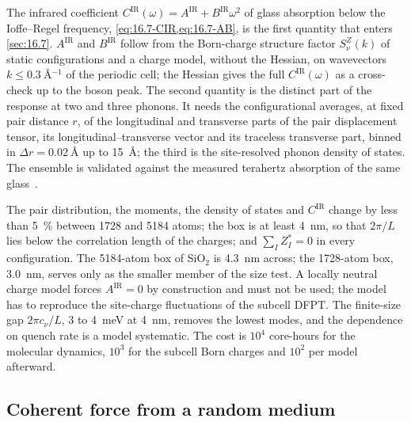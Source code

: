 The infrared coefficient $C^{\mathrm{IR}}(\omega) = A^{\mathrm{IR}} + B^{\mathrm{IR}}\omega^2$ of glass absorption below the Ioffe--Regel frequency, \cref{eq:16.7-CIR,eq:16.7-AB}, is the first quantity that enters \cref{sec:16.7}. $A^{\mathrm{IR}}$ and $B^{\mathrm{IR}}$ follow from the Born-charge structure factor $S^Z_\nu(k)$ of static configurations and a charge model, without the Hessian, on wavevectors $k \le \SI{0.3}{\angstrom^{-1}}$ of the periodic cell; the Hessian gives the full $C^{\mathrm{IR}}(\omega)$ as a cross-check up to the boson peak. The second quantity is the distinct part of the response at two and three phonons. It needs the configurational averages, at fixed pair distance $r$, of the longitudinal and transverse parts of the pair displacement tensor, its longitudinal--transverse vector and its traceless transverse part, binned in $\Delta r = \SI{0.02}{\angstrom}$ up to \SI{15}{\angstrom}; the third is the site-resolved phonon density of states. The ensemble is validated against the measured terahertz absorption of the same glass~\cite{taraskin2006universal}.

The pair distribution, the moments, the density of states and $C^{\mathrm{IR}}$ change by less than \SI{5}{\percent} between 1728 and 5184 atoms; the box is at least \SI{4}{nm}, so that $2\pi/L$ lies below the correlation length of the charges; and $\sum_I Z^*_I = 0$ in every configuration. The 5184-atom box of SiO$_2$ is \SI{4.3}{nm} across; the 1728-atom box, \SI{3.0}{nm}, serves only as the smaller member of the size test. A locally neutral charge model forces $A^{\mathrm{IR}} = 0$ by construction and must not be used; the model has to reproduce the site-charge fluctuations of the subcell DFPT. The finite-size gap $2\pi c_\nu/L$, 3 to \SI{4}{meV} at \SI{4}{nm}, removes the lowest modes, and the dependence on quench rate is a model systematic. The cost is $10^4$ core-hours for the molecular dynamics, $10^3$ for the subcell Born charges and $10^2$ per model afterward.

\subsection{Coherent force from a random medium}

